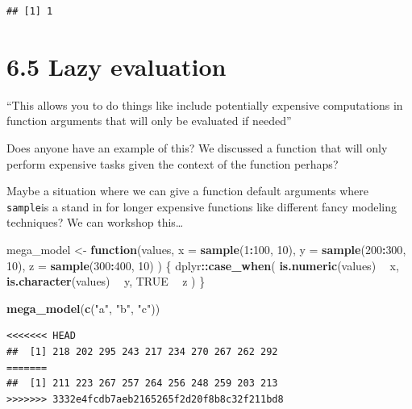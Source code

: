 \documentclass[]{book}
\newenvironment{Shaded}{\begin{snugshade}}{\end{snugshade}}
\newcommand{\ControlFlowTok}[1]{\textcolor[rgb]{0.13,0.29,0.53}{\textbf{#1}}}
\newcommand{\DataTypeTok}[1]{\textcolor[rgb]{0.13,0.29,0.53}{#1}}
\newcommand{\DecValTok}[1]{\textcolor[rgb]{0.00,0.00,0.81}{#1}}
\newcommand{\KeywordTok}[1]{\textcolor[rgb]{0.13,0.29,0.53}{\textbf{#1}}}
\newcommand{\NormalTok}[1]{#1}
\newcommand{\OperatorTok}[1]{\textcolor[rgb]{0.81,0.36,0.00}{\textbf{#1}}}
\newcommand{\OtherTok}[1]{\textcolor[rgb]{0.56,0.35,0.01}{#1}}
\newcommand{\StringTok}[1]{\textcolor[rgb]{0.31,0.60,0.02}{#1}}
\begin{document}
\begin{verbatim}
## [1] 1
\end{verbatim}

\hypertarget{lazy-evaluation}{%
\section*{6.5 Lazy evaluation}\label{lazy-evaluation}}

``This allows you to do things like include potentially expensive computations in function arguments that will only be evaluated if needed''

Does anyone have an example of this? We discussed a function that will only perform expensive tasks given the context of the function perhaps?

Maybe a situation where we can give a function default arguments where \texttt{sample}is a stand in for longer expensive functions like different fancy modeling techniques? We can workshop this\ldots{}

\begin{Shaded}
\begin{Highlighting}[]
\NormalTok{mega_model <-}\StringTok{ }\ControlFlowTok{function}\NormalTok{(values, }\DataTypeTok{x =} \KeywordTok{sample}\NormalTok{(}\DecValTok{1}\OperatorTok{:}\DecValTok{100}\NormalTok{, }\DecValTok{10}\NormalTok{), }\DataTypeTok{y =} \KeywordTok{sample}\NormalTok{(}\DecValTok{200}\OperatorTok{:}\DecValTok{300}\NormalTok{, }\DecValTok{10}\NormalTok{), }\DataTypeTok{z =} \KeywordTok{sample}\NormalTok{(}\DecValTok{300}\OperatorTok{:}\DecValTok{400}\NormalTok{, }\DecValTok{10}\NormalTok{)}
\NormalTok{) \{}
\NormalTok{  dplyr}\OperatorTok{::}\KeywordTok{case_when}\NormalTok{(}
    \KeywordTok{is.numeric}\NormalTok{(values) }\OperatorTok{~}\StringTok{ }\NormalTok{x,}
    \KeywordTok{is.character}\NormalTok{(values) }\OperatorTok{~}\StringTok{ }\NormalTok{y,}
    \OtherTok{TRUE} \OperatorTok{~}\StringTok{ }\NormalTok{z}
\NormalTok{  )}
\NormalTok{\}}

\KeywordTok{mega_model}\NormalTok{(}\KeywordTok{c}\NormalTok{(}\StringTok{"a"}\NormalTok{, }\StringTok{"b"}\NormalTok{, }\StringTok{"c"}\NormalTok{))}
\end{Highlighting}
\end{Shaded}

\begin{verbatim}
<<<<<<< HEAD
##  [1] 218 202 295 243 217 234 270 267 262 292
=======
##  [1] 211 223 267 257 264 256 248 259 203 213
>>>>>>> 3332e4fcdb7aeb2165265f2d20f8b8c32f211bd8
\end{verbatim}
\end{document}

